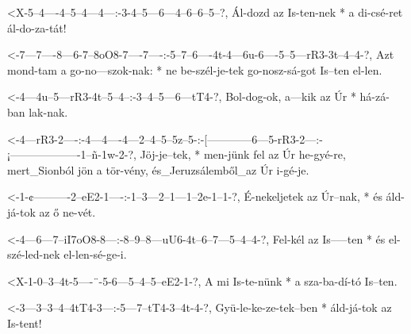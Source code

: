   {<X-5--4----4--5--4---4---:-3-4--5---6---4--6--6--5--?,}
  {   Ál-dozd az Is-ten-nek * a di-csé-ret ál-do-za-tát!}

  {<-7---7----8---6-7--8oO8-7----7----:-5--7--6----4t-4---6u-6----5--5---rR3-3t--4--4-?,}
  {  Azt mond-tam a go-no---szok-nak: * ne be-szél-je-tek go-nosz-sá-got Is--ten el-len.}



  {<-4---4u--5---rR3-4t--5--4--:-3--4--5---6---tT4-?,}
  {  Bol-dog-ok, a---kik az Úr * há-zá-ban lak-nak.}

  {<-4---rR3-2----:-4---4----4---2--4--5--5z--5-:-[------------6---5-rR3-2---:-¡-------------------1--ñ-1w-2-?,}
  {  Jöj-je--tek, * men-jünk fel az Úr he-gyé-re, mert_Sionból jön a tör-vény, és_Jeruzsálemből_az Úr i-gé-je.}

  {<-1-¢----------2--eE2-1----:-1--3---2--1---1--2e-1--1-?,}
  {  É-nekeljetek az Úr--nak, * és áld-já-tok az ő  ne-vét.}




  {<-4---6---7--iI7oO8-8---:-8--9--8---uU6-4t--6--7---5--4--4-?,}
  {  Fel-kél az Is-----ten * és el-szé-led-nek el-len-sé-ge-i.}

  {<X-1-0--3--4t-5----¨-5-6---5--4--5--eE2-1-?,}
  {   A mi Is-te-nünk * a sza-ba-dí-tó Is--ten.}

  {<-3---3--3--4--4tT4-3---:-5---7--tT4-3--4t-4-?,}
  {  Gyü-le-ke-ze-tek--ben * áld-já-tok az Is-tent!}


